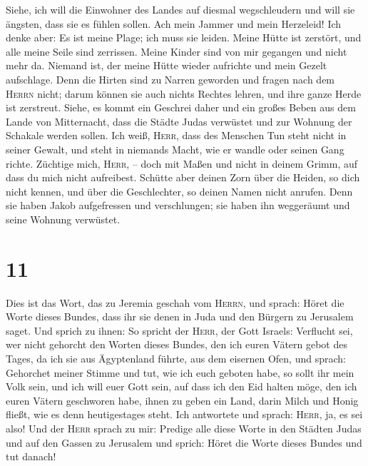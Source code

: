 Siehe, ich will die Einwohner des Landes auf diesmal wegschleudern und
will sie ängsten, dass sie es fühlen sollen.  Ach mein
Jammer und mein Herzeleid! Ich denke aber: Es ist meine Plage; ich muss
sie leiden.  Meine Hütte ist zerstört, und alle meine
Seile sind zerrissen. Meine Kinder sind von mir gegangen und nicht mehr
da. Niemand ist, der meine Hütte wieder aufrichte und mein Gezelt
aufschlage.  Denn die Hirten sind zu Narren geworden und
fragen nach dem \textsc{Herrn} nicht; darum können sie auch nichts
Rechtes lehren, und ihre ganze Herde ist zerstreut. 
Siehe, es kommt ein Geschrei daher und ein großes Beben aus dem Lande
von Mitternacht, dass die Städte Judas verwüstet und zur Wohnung der
Schakale werden sollen.  Ich weiß, \textsc{Herr}, dass
des Menschen Tun steht nicht in seiner Gewalt, und steht in niemands
Macht, wie er wandle oder seinen Gang richte.  Züchtige
mich, \textsc{Herr}, -- doch mit Maßen und nicht in deinem Grimm, auf
dass du mich nicht aufreibest.  Schütte aber deinen Zorn
über die Heiden, so dich nicht kennen, und über die Geschlechter, so
deinen Namen nicht anrufen. Denn sie haben Jakob aufgefressen und
verschlungen; sie haben ihn weggeräumt und seine Wohnung verwüstet.

\hypertarget{section-10}{%
\section{11}\label{section-10}}

 Dies ist das Wort, das zu Jeremia geschah vom
\textsc{Herrn}, und sprach:  Höret die Worte dieses
Bundes, dass ihr sie denen in Juda und den Bürgern zu Jerusalem saget.
 Und sprich zu ihnen: So spricht der \textsc{Herr}, der
Gott Israels: Verflucht sei, wer nicht gehorcht den Worten dieses
Bundes,  den ich euren Vätern gebot des Tages, da ich sie
aus Ägyptenland führte, aus dem eisernen Ofen, und sprach: Gehorchet
meiner Stimme und tut, wie ich euch geboten habe, so sollt ihr mein Volk
sein, und ich will euer Gott sein,  auf dass ich den Eid
halten möge, den ich euren Vätern geschworen habe, ihnen zu geben ein
Land, darin Milch und Honig fließt, wie es denn heutigestages steht. Ich
antwortete und sprach: \textsc{Herr}, ja, es sei also! 
Und der \textsc{Herr} sprach zu mir: Predige alle diese Worte in den
Städten Judas und auf den Gassen zu Jerusalem und sprich: Höret die
Worte dieses Bundes und tut danach!

